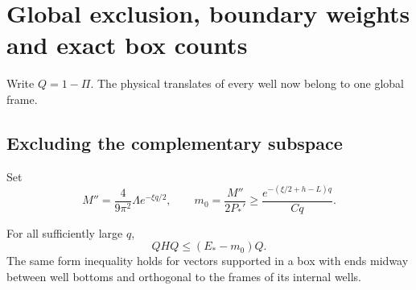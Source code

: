 \section{Global exclusion, boundary weights and exact box counts}\label{app:global}
Write $Q=1-\Pi$. The physical translates of every well now belong to one global frame.

\subsection{Excluding the complementary subspace}
Set
\begin{equation}\label{eq:m0}
 M''=\frac4{9\pi^2}\Lambda e^{-\xi q/2},\qquad
 m_0=\frac{M''}{2P_*'}
 \ge\frac{e^{-(\xi/2+h-L)q}}{Cq}.
\end{equation}

\begin{lemma}\label{lem:complement}
For all sufficiently large $q$,
\begin{equation}\label{eq:complement}
 QHQ\le(E_*-m_0)Q.
\end{equation}
The same form inequality holds for vectors supported in a box with ends midway between well bottoms and orthogonal to the frames of its internal wells.
\end{lemma}
